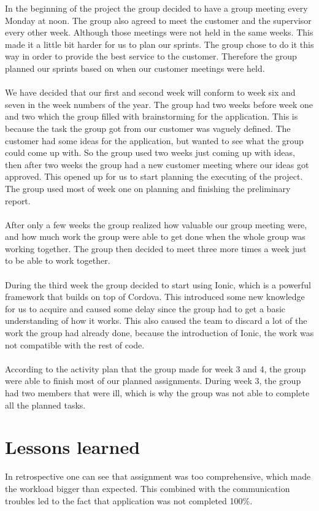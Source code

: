 In the beginning of the project the group decided to have a group meeting every Monday at noon. The group also agreed to meet the customer and the supervisor every other week. Although those meetings were not held in the same weeks. This made it a little bit harder for us to plan our sprints. The group chose to do it this way in order to provide the best service to the customer. Therefore the group planned our sprints based on when our customer meetings were held. 
\\
\\
We have decided that our first and second week will conform to week six and seven in the week numbers of the year. The group had two weeks before week one and two which the group filled with brainstorming for the application. This is because the task the group got from our customer was vaguely defined. The customer had some ideas for the application, but wanted to see what the group could come up with. So the group used two weeks just coming up with ideas, then after two weeks the group had a new customer meeting where our ideas got approved. This opened up for us to start planning the executing of the project. The group used most of week one on planning and finishing the preliminary report.
\\
\\
After only a few weeks the group realized how valuable our group meeting were, and how much work the group were able to get done when the whole group was working together. The group then decided to meet three more times a week just to be able to work together. 
\\
\\
During the third week the group decided to start using Ionic, which is a powerful framework that builds on top of Cordova. This introduced some new knowledge for us to acquire and caused some delay since the group had to get a basic understanding of how it works. This also caused the team to discard a lot of the work the group had already done, because the introduction of Ionic, the work was not compatible with the rest of code.
\\
\\
According to the activity plan that the group made for week 3 and 4, the group were able to finish most of our planned assignments. During week 3, the group had two members that were ill, which is why the group was not able to complete all the planned tasks. 



\section{Lessons learned}
In retrospective one can see that assignment was too comprehensive, which made the workload bigger than expected. This combined with the communication troubles led to the fact that application was not completed 100\%.





